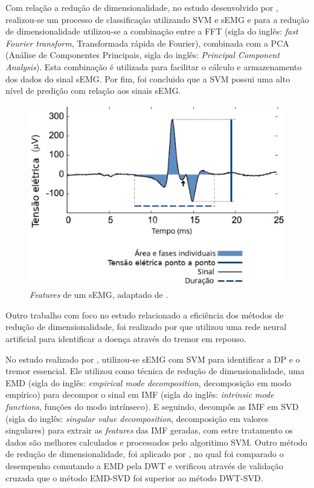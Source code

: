Com relação a redução de dimensionalidade, no estudo desenvolvido por , realizou-se um processo de classificação utilizando SVM e sEMG e para a redução de dimensionalidade utilizou-se a combinação entre a FFT (sigla do inglês: \textit{fast Fourier transform}, Transformada rápida de Fourier), combinada com a PCA (Análise de Componentes Principais, sigla do inglês: \textit{Principal Component Analysis}). Esta combinação é utilizada para facilitar o cálculo e armazenamento dos dados do sinal sEMG. Por fim,  foi concluido que a SVM possui uma alto nível de predição com relação aos sinais sEMG.

\begin{figure}[h]
    \centering
     \includegraphics[width=1\textwidth]{figuras/featuresEMG.eps}
     \caption{\textit{Features} de um sEMG, adaptado de .}
     \label{featuresEMG}
 \end{figure}

Outro trabalho com foco no estudo relacionado a eficiência dos métodos de redução de dimensionalidade, foi realizado por  que utilizou uma rede neural artificial para identificar a doença através do tremor em repouso. 

No estudo realizado por , utilizou-se sEMG com SVM para identificar a DP e o tremor essencial. Ele utilizou como técnica de redução de dimensionalidade, uma EMD (sigla do inglês: \textit{empirical mode decomposition}, decomposição em modo empírico) para decompor o sinal em IMF (sigla do inglês: \textit{intrinsic mode functions}, funções do modo intrínseco). E seguindo, decompôs as IMF em SVD (sigla do inglês: \textit{singular value decomposition}, decomposição em valores singulares) para extrair as \textit{features} das IMF geradas, com estre tratamento os dados são melhores calculados e processados pelo algoritimo SVM. Outro método de redução de dimensionalidade, foi aplicado por , no qual foi comparado o desempenho comutando a EMD pela DWT e verificou através de validação cruzada que o método EMD-SVD foi superior ao método DWT-SVD.

